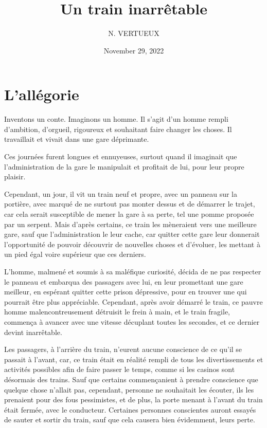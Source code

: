 \documentclass[]{liberty}
\begin{document}
\title{Un train inarrêtable}

\author{N. VERTUEUX}
\date{November 29, 2022}

\maketitle

\section*{L'allégorie} 
Inventons un conte. Imaginons un homme. Il s'agit d'un homme rempli d'ambition, d'orgueil, rigoureux et 
souhaitant faire changer les choses. Il travaillait et vivait dans une gare déprimante. 

Ces journées furent longues et ennuyeuses, surtout quand il imaginait que l'administration de la gare le 
manipulait et profitait de lui, pour leur propre plaisir.\newline

Cependant, un jour, il vit un train neuf et propre, avec un panneau sur la portière, avec marqué de ne surtout pas 
monter dessus et de démarrer le trajet, car cela serait susceptible de mener la gare à sa perte, tel une pomme 
proposée par un serpent. Mais d'après certains, ce train les mèneraient vers une meilleure gare, sauf que 
l'administration le leur cache, car quitter cette gare leur donnerait l'opportunité de pouvoir découvrir de nouvelles 
choses et d'évoluer, les mettant à un pied égal voire supérieur que ces derniers.   

L'homme, malmené et soumis à sa maléfique curiosité, décida de ne pas respecter le panneau 
et embarqua des passagers avec lui, en leur promettant une gare meilleur, en espérant quitter 
cette prison dépressive, pour en trouver une qui pourrait être plus appréciable. Cependant, après 
avoir démarré le train, ce pauvre homme malencontreusement détruisit le frein à main, et le train fragile, 
commença à avancer avec une vitesse décuplant toutes les secondes, et ce dernier devint inarrêtable. 

Les passagers, à l'arrière du train, n'eurent aucune conscience de ce qu'il se passait à l'avant, car,
ce train était en réalité rempli de tous les divertissements et activités possibles afin de faire passer le temps, 
comme si les casinos sont désormais des trains.
Sauf que certains commençanient à prendre conscience que quelque chose n'allait pas, cependant, personne ne 
souhaitait les écouter, ils les prenaient pour des fous pessimistes, et de plus, la porte menant à l'avant du train 
était fermée, avec le conducteur. Certaines personnes conscientes auront essayés de sauter et sortir du train, sauf 
que cela causera bien évidemment, leurs perte.
\end{document}
